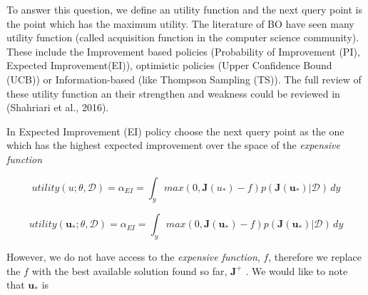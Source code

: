 \documentclass[]{elsarticle} %
\begin{document}
To answer this question, we define an utility function and the next query point is the point which has the maximum utility. The literature of BO have seen many utility function (called acquisition function in the computer science community). These include the Improvement based policies (Probability of Improvement (PI), Expected Improvement(EI)), optimistic policies (Upper Confidence Bound (UCB)) or Information-based (like Thompson Sampling (TS)). The full review of these utility function an their strengthen and weakness could be reviewed in (Shahriari et al., 2016).

In Expected Improvement (EI) policy choose the next query point as the one which has the highest expected improvement over the space of the \emph{expensive function}

\begin{equation}

utility(u;\theta,\mathcal{D})=\alpha_{EI}=\int_{y}^{}max(0,\mathbf{J}(u_*)-f)p(\mathbf{J}(\mathbf{u_*})|\mathcal{D}) \,dy

\label{eq:uti_int}

\end{equation}

\[utility(\mathbf{u}_*;\theta,\mathcal{D})=\alpha_{EI}=\int_{y}^{}max(0,\mathbf{J}(\mathbf{u}_*)-f)p(\mathbf{J}(\mathbf{u_*})|\mathcal{D}) \,dy\]

However, we do not have access to the \emph{expensive function}, \(f\), therefore we replace the \(f\) with the best available solution found so far, \(\mathbf{J}^+\) . We would like to note that \(\mathbf{u}_*\) is
\end{document}
